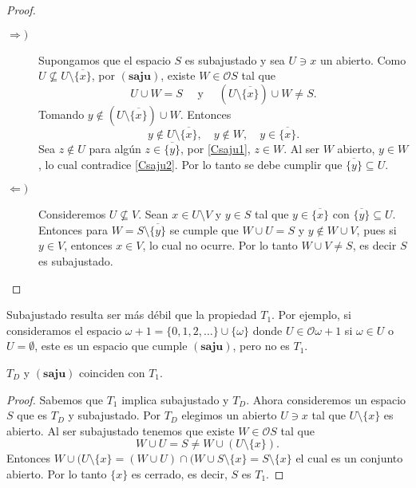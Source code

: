 \documentclass{comunicaciones}
\begin{document}
\begin{proof}
    \begin{description}
        \item[$\Rightarrow )$] Supongamos que el espacio $S$ es subajustado y sea $U\ni x$ un abierto. Como $U\nsubseteq U\setminus \overline{\{x\}}$, por $(\mathbf{saju})$, existe $W\in \mathcal{O}S$ tal que 
        \begin{equation}\label{Csaju1}
            U\cup W=S \quad\mbox{ y }\quad(U\setminus\overline{\{x\}})\cup W\neq S.
        \end{equation}
        Tomando $y\notin (U\setminus\overline{\{x\}})\cup W$. Entonces 
        \begin{equation}\label{Csaju2}
            y\notin U\setminus\overline{\{x\}}, \quad y\notin W, \quad y\in \overline{\{x\}}.
        \end{equation}
        Sea $z\notin U$ para algún $z\in \overline{\{y\}}$, por \ref{Csaju1}, $z\in W$. Al ser $W$ abierto, $y\in W$, lo cual contradice \ref{Csaju2}. Por lo tanto se debe cumplir que $\overline{\{y\}}\subseteq U$.
        \item[$\Leftarrow )$] Consideremos $U\nsubseteq V$.  Sean $x\in U\setminus V$ y $y\in S$ tal que $y\in \overline{\{x\}}$ con $\overline{\{y\}}\subseteq U$. Entonces para $W=S\setminus \overline{\{y\}}$ se cumple que $W\cup U=S$ y $y\notin W\cup V$, pues si $y\in V$, entonces $x\in V$, lo cual no ocurre. Por lo tanto $W\cup V\neq S$, es decir $S$ es subajustado.
    \end{description}
\end{proof}

Subajustado resulta ser más débil que la propiedad $T_1$. Por ejemplo, si consideramos el espacio $\omega +1=\{0, 1, 2, \dots \}\cup \{\omega\}$ donde $U\in \mathcal{O}\omega +1$ si $\omega\in U$ o $U=\emptyset$, este es un espacio que cumple $(\mathbf{saju})$, pero no es $T_1$.

\begin{prop}
    $T_D$ y $(\mathbf{saju})$ coinciden con $T_1$.
\end{prop}

\begin{proof}
    Sabemos que $T_1$ implica subajustado y $T_D$. Ahora consideremos un espacio $S$ que es $T_D$ y subajustado. Por $T_D$ elegimos un abierto $U\ni x$ tal que $U\setminus \{x\}$ es abierto. Al ser subajustado tenemos que existe $W\in \mathcal{O}S$ tal que 
    \[
    W\cup U=S\neq W\cup (U\setminus \{x\}).
    \]
    Entonces $W\cup (U\setminus\{x\}=(W\cup U)\cap (W\cup S\setminus\{x\}=S\setminus\{x\}$ el cual es un conjunto abierto. Por lo tanto $\{x\}$ es cerrado, es decir, $S$ es $T_1$.
\end{proof}
\end{document}
